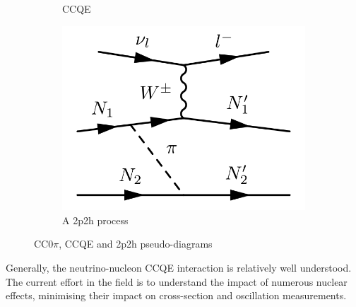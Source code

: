 \begin{figure}[h]
\begin{subfigure}[t]{0.32\textwidth}
		\caption{CCQE}
	\end{subfigure}
	\begin{subfigure}[t]{0.32\textwidth}
		\includegraphics[width=\textwidth, trim={0mm 0mm 0mm 0mm}, clip,page=1]{figures/niwg/diagrams/2p2h_possibly}
		\caption{A 2p2h process}
	\end{subfigure}
	\caption{CC0$\pi$, CCQE and 2p2h pseudo-diagrams}
	\label{fig:cc0pi_diag}
\end{figure}
Generally, the neutrino-nucleon CCQE interaction is relatively well understood. The current effort in the field is to understand the impact of numerous nuclear effects, minimising their impact on cross-section and oscillation measurements.

